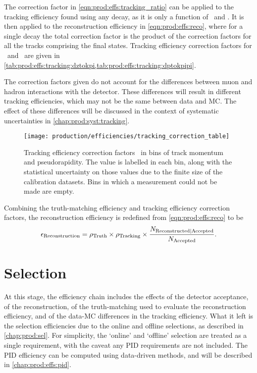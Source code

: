 The correction factor in \cref{eqn:prod:effs:tracking_ratio} can be applied to 
the tracking efficiency found using any decay, as it is only a function of 
\ptot\ and \Eta.
It is then applied to the reconstruction efficiency in 
\cref{eqn:prod:effs:reco}, where for a single decay the total correction factor 
is the product of the correction factors for all the tracks comprising the 
final states.
Tracking efficiency correction factors for \DzToKpi\ and \DpToKpipi\ are given 
in \cref{tab:prod:effs:tracking:dztokpi,tab:prod:effs:tracking:dptokpipi}.

The correction factors given do not account for the differences between muon 
and hadron interactions with the detector.
These differences will result in different tracking efficiencies, which may not 
be the same between data and \ac{MC}.
The effect of these differences will be discussed in the context of systematic 
uncertainties in \cref{chap:prod:syst:tracking}.

\begin{figure}
  \centering
  \texttt{[image: production/efficiencies/tracking\_correction\_table]}
  \caption{%
    Tracking efficiency correction factors \efftracking\ in bins of track 
    momentum and pseudorapidity.
    The value is labelled in each bin, along with the statistical uncertainty 
    on those values due to the finite size of the calibration datasets.
    Bins in which a measurement could not be made are empty.
  }
  \label{fig:prod:effs:tracking_table}
\end{figure}

Combining the truth-matching efficiency and tracking efficiency correction 
factors, the reconstruction efficiency is redefined from 
\cref{eqn:prod:effs:reco} to be
\begin{equation}
  \effreco = \efftruth\times\efftracking\times\frac{%
    N_{\text{Reconstructed}|\text{Accepted}}
  }
  {%
    N_{\text{\text{Accepted}}}
  }.
  \label{eqn:prod:effs:reco_corrected}
\end{equation}

\section{Selection}
\label{chap:prod:effs:sel}

At this stage, the efficiency chain includes the effects of the detector 
acceptance, of the reconstruction, of the truth-matching used to evaluate the 
reconstruction efficiency, and of the data-\ac{MC} differences in the tracking 
efficiency.
What it left is the selection efficiencies due to the online and offline 
selections, as described in \cref{chap:prod:sel}.
For simplicity, the `online' and `offline' selection are treated as a single 
requirement, with the caveat any \ac{PID} requirements are not included.
The \ac{PID} efficiency can be computed using data-driven methods, and will be 
described in \cref{chap:prod:effs:pid}.

